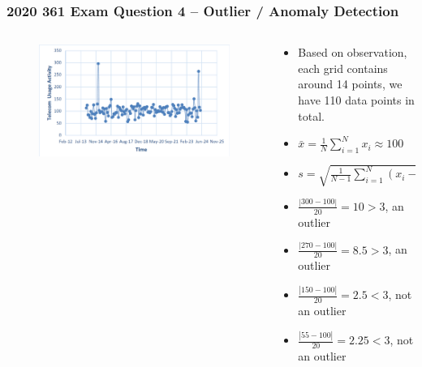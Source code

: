 \documentclass[aspectratio=169, 10pt]{beamer}
\begin{document}
\begin{frame}
    \frametitle{2020 361 Exam Question 4 -- Outlier / Anomaly Detection}
    
    \begin{columns}[]
        \begin{column}{0.5\textwidth}
            \begin{figure}
                \centering
                \includegraphics[width=\textwidth]{../imgs/question4.png}
            \end{figure}
        \end{column}
        \begin{column}{0.5\textwidth}
            \begin{itemize}
                \item Based on observation, each grid contains around 14 points, we have 110 data points in total. 
                \item $\bar{x} = \frac{1}{N}\sum^N_{i=1}x_i \approx 100$
                \item $s = \sqrt{\frac{1}{N-1}\sum^N_{i=1}(x_i - \bar{x})^2} \approx 20$
                \item $\frac{|300 - 100|}{20}=10 > 3$, an outlier
                \item $\frac{|270 - 100|}{20}=8.5 > 3$, an outlier
                \item $\frac{|150 - 100|}{20}=2.5 < 3$, not an outlier
                \item $\frac{|55 - 100|}{20}=2.25 < 3$, not an outlier
            \end{itemize}
        \end{column}
    \end{columns}

\end{frame}
\end{document}
